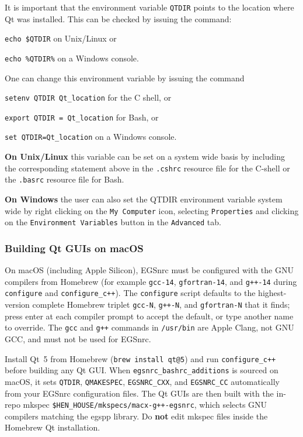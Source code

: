 \documentclass[12pt,twoside]{article}   %
\begin{document}
It is important that the environment variable {\tt QTDIR} points to the location where
Qt was installed. This can be checked by issuing the command:

      {\tt echo \$QTDIR} on Unix/Linux or

      {\tt echo \%QTDIR\%} on a Windows console.

One can change this environment variable by issuing the command

      {\tt setenv QTDIR Qt\_location} for the C shell, or

      {\tt export QTDIR = Qt\_location} for Bash, or

      {\tt set QTDIR=Qt\_location} on a Windows console.

{\bf On Unix/Linux} this variable can be set on a system wide basis by including the
corresponding statement above in the {\tt .cshrc} resource file for the C-shell or
the {\tt .basrc} resource file for Bash.

{\bf On Windows} the user can also set the QTDIR environment variable system wide by
right clicking on the {\tt My Computer} icon, selecting {\tt Properties} and clicking on the
{\tt Environment Variables} button in the {\tt Advanced} tab.

\subsubsection{Building Qt GUIs on macOS}
\label{building_macos_qt}

On macOS (including Apple Silicon), EGSnrc must be configured with the GNU
compilers from Homebrew (for example {\tt gcc-14}, {\tt gfortran-14}, and
{\tt g++-14} during {\tt configure} and {\tt configure\_c++}).
The {\tt configure} script defaults to the highest-version complete Homebrew
triplet {\tt gcc-N}, {\tt g++-N}, and {\tt gfortran-N} that it finds; press
enter at each compiler prompt to accept the default, or type another name to
override.
The {\tt gcc} and {\tt g++} commands in {\tt /usr/bin} are Apple Clang, not GNU
GCC, and must not be used for EGSnrc.

Install Qt~5 from Homebrew ({\tt brew install qt@5}) and run {\tt configure\_c++}
before building any Qt GUI. When {\tt egsnrc\_bashrc\_additions} is sourced on
macOS, it sets {\tt QTDIR}, {\tt QMAKESPEC}, {\tt EGSNRC\_CXX}, and
{\tt EGSNRC\_CC} automatically from your EGSnrc configuration files.
The Qt GUIs are then built with the in-repo mkspec
{\tt \$HEN\_HOUSE/mkspecs/macx-g++-egsnrc}, which selects GNU compilers
matching the egspp library. Do {\bf not} edit mkspec files inside the Homebrew
Qt installation.
\end{document}
